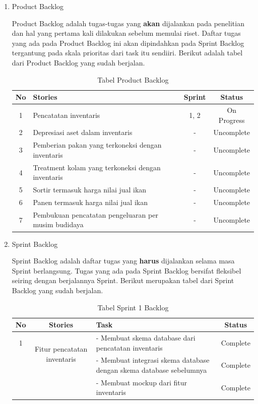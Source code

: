 \begin{enumerate}
	\item Product Backlog
	
	Product Backlog adalah tugas-tugas yang \textbf{akan} dijalankan pada penelitian dan hal yang pertama kali dilakukan sebelum memulai riset. Daftar tugas yang ada pada Product Backlog ini akan dipindahkan pada Sprint Backlog tergantung pada skala prioritas dari task itu sendiiri. Berikut adalah tabel dari Product Backlog yang sudah berjalan.

	\begin{table}[H]	
		\begin{center}
			\caption{Tabel Product Backlog}
			\label{tab:table5}
			\begin{tabular}{|c|m{17em}|c|c|}
			\hline
			\textbf{No} & \textbf{Stories} & \textbf{Sprint} & \textbf{Status} \\
			\hline
			1 & Pencatatan inventaris & 1, 2 & On Progress \\
			\hline
			2 & Depresiasi aset dalam inventaris & - & Uncomplete \\
			\hline
			3 & Pemberian pakan yang terkoneksi dengan inventaris & - & Uncomplete \\
			\hline
			4 & Treatment kolam yang terkoneksi dengan inventaris & - & Uncomplete \\
			\hline
			5 & Sortir termasuk harga nilai jual ikan & - & Uncomplete \\
			\hline
			6 & Panen termasuk harga nilai jual ikan & - & Uncomplete \\
			\hline
			7 & Pembukuan pencatatan pengeluaran per musim budidaya & - & Uncomplete \\
			\hline
			\end{tabular}
		\end{center}
	\end{table}	

	\item Sprint Backlog
	
	Sprint Backlog adalah daftar tugas yang \textbf{harus} dijalankan selama masa Sprint berlangsung. Tugas yang ada pada Sprint Backlog bersifat fleksibel seiring dengan berjalannya Sprint. Berikut merupakan tabel dari Sprint Backlog yang sudah berjalan.

	\begin{table}[H]	
		\begin{center}
			\caption{Tabel Sprint 1 Backlog}
			\label{tab:table6}
			\begin{tabular}{|c|c|m{13em}|c|}
			\hline
			\textbf{No} & \textbf{Stories} & \textbf{Task} & \textbf{Status} \\
			\hline
			1 & \multirow{2}{10em}{Fitur pencatatan inventaris} & - Membuat skema database dari pencatatan inventaris & Complete \\
			&  & - Membuat integrasi skema database dengan skema database sebelumnya & Complete \\
			&  & - Membuat mockup dari fitur inventaris & Complete \\
			\hline
			\end{tabular}
		\end{center}
	\end{table}


\end{enumerate}
